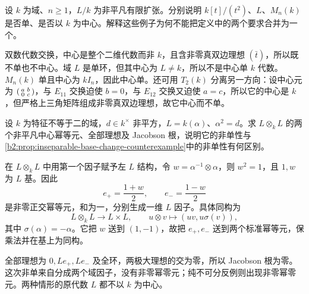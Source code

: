 \begin{exercise}\label{b2:ex:17-simple-central-distinction}
	设 \(k\) 为域、\(n\ge1\)，\(L/k\) 为非平凡有限扩张。分别说明 \(k[t]/(t^2)\)、\(L\)、\(M_n(k)\) 是否单、是否以 \(k\) 为中心。解释这些例子为何不能把定义中的两个要求合并为一个。
\end{exercise}
\begin{solution}
	双数代数交换，中心是整个二维代数而非 \(k\)，且含非零真双边理想 \((\bar t)\)，所以既不单也不中心。域 \(L\) 是单环，但其中心为 \(L\ne k\)，所以不是中心单 \(k\) 代数。\(M_n(k)\) 单且中心为 \(kI_n\)，因此中心单。还可用 \(T_2(k)\) 分离另一方向：设中心元为 \(\begin{psmallmatrix}a&b\\0&c\end{psmallmatrix}\)，与 \(E_{11}\) 交换迫使 \(b=0\)，与 \(E_{12}\) 交换又迫使 \(a=c\)，所以它的中心是 \(k\)，但严格上三角矩阵组成非零真双边理想，故它中心而不单。
\end{solution}

\begin{exercise}\label{b2:ex:17-inseparable-tensor}
	设 \(k\) 为特征不等于二的域，\(d\in k^\times\) 非平方，\(L=k(\alpha)\)、\(\alpha^2=d\)。求 \(L\otimes_kL\) 的两个非平凡中心幂等元、全部理想及 Jacobson 根，说明它的非单性与\cref{b2:prop:inseparable-base-change-counterexample}中的非单性有何区别。
\end{exercise}
\begin{solution}
	在 \(L\otimes_kL\) 中用第一个因子赋予左 \(L\) 结构，令 \(w=\alpha^{-1}\otimes\alpha\)，则 \(w^2=1\)，且 \(1,w\) 为 \(L\) 基。因此
	\[
		e_+=\frac{1+w}{2},\qquad e_-=\frac{1-w}{2}
	\]
	是非零正交幂等元，和为一，分别生成一维 \(L\) 因子。具体同构为
	\[
		L\otimes_kL\longrightarrow L\times L,\qquad u\otimes v\longmapsto(uv,u\sigma(v)),
	\]
	其中 \(\sigma(\alpha)=-\alpha\)。它把 \(w\) 送到 \((1,-1)\)，故把 \(e_+,e_-\) 送到两个标准幂等元，保乘法并在基上为同构。

	全部理想为 \(0,Le_+,Le_-\) 及全环，两极大理想的交为零，所以 Jacobson 根为零。这次非单来自分成两个域因子，没有非零幂零元；纯不可分反例则出现非零幂零元。两种情形的原代数 \(L\) 都不以 \(k\) 为中心。
\end{solution}

